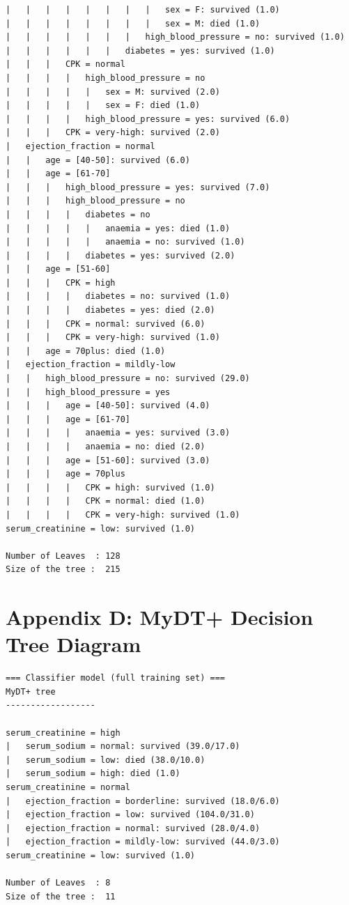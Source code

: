 \documentclass[12pt,a4paper]{article}
\begin{document}
{\begin{verbatim}
|   |   |   |   |   |   |   |   sex = F: survived (1.0)
|   |   |   |   |   |   |   |   sex = M: died (1.0)
|   |   |   |   |   |   |   high_blood_pressure = no: survived (1.0)
|   |   |   |   |   |   diabetes = yes: survived (1.0)
|   |   |   CPK = normal
|   |   |   |   high_blood_pressure = no
|   |   |   |   |   sex = M: survived (2.0)
|   |   |   |   |   sex = F: died (1.0)
|   |   |   |   high_blood_pressure = yes: survived (6.0)
|   |   |   CPK = very-high: survived (2.0)
|   ejection_fraction = normal
|   |   age = [40-50]: survived (6.0)
|   |   age = [61-70]
|   |   |   high_blood_pressure = yes: survived (7.0)
|   |   |   high_blood_pressure = no
|   |   |   |   diabetes = no
|   |   |   |   |   anaemia = yes: died (1.0)
|   |   |   |   |   anaemia = no: survived (1.0)
|   |   |   |   diabetes = yes: survived (2.0)
|   |   age = [51-60]
|   |   |   CPK = high
|   |   |   |   diabetes = no: survived (1.0)
|   |   |   |   diabetes = yes: died (2.0)
|   |   |   CPK = normal: survived (6.0)
|   |   |   CPK = very-high: survived (1.0)
|   |   age = 70plus: died (1.0)
|   ejection_fraction = mildly-low
|   |   high_blood_pressure = no: survived (29.0)
|   |   high_blood_pressure = yes
|   |   |   age = [40-50]: survived (4.0)
|   |   |   age = [61-70]
|   |   |   |   anaemia = yes: survived (3.0)
|   |   |   |   anaemia = no: died (2.0)
|   |   |   age = [51-60]: survived (3.0)
|   |   |   age = 70plus
|   |   |   |   CPK = high: survived (1.0)
|   |   |   |   CPK = normal: died (1.0)
|   |   |   |   CPK = very-high: survived (1.0)
serum_creatinine = low: survived (1.0)

Number of Leaves  :	128
Size of the tree :	215
\end{verbatim}
}

\section*{Appendix D: MyDT+ Decision Tree Diagram}
{\scriptsize
\begin{verbatim}
=== Classifier model (full training set) ===
MyDT+ tree
------------------

serum_creatinine = high
|   serum_sodium = normal: survived (39.0/17.0)
|   serum_sodium = low: died (38.0/10.0)
|   serum_sodium = high: died (1.0)
serum_creatinine = normal
|   ejection_fraction = borderline: survived (18.0/6.0)
|   ejection_fraction = low: survived (104.0/31.0)
|   ejection_fraction = normal: survived (28.0/4.0)
|   ejection_fraction = mildly-low: survived (44.0/3.0)
serum_creatinine = low: survived (1.0)

Number of Leaves  :	8
Size of the tree :	11
\end{verbatim}
}
\end{document}
